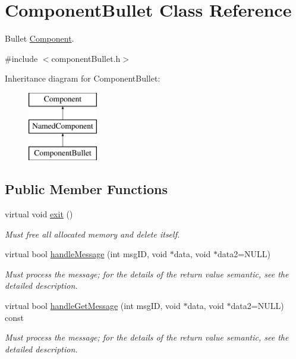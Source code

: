 \hypertarget{classComponentBullet}{
\section{\-Component\-Bullet \-Class \-Reference}
\label{d0/d26/classComponentBullet}
}


\-Bullet \hyperlink{classComponent}{\-Component}.  




{\ttfamily \#include $<$component\-Bullet.\-h$>$}

\-Inheritance diagram for \-Component\-Bullet\-:\begin{figure}[H]
\begin{center}
\leavevmode
\includegraphics[height=3.000000cm]{d0/d26/classComponentBullet}
\end{center}
\end{figure}
\subsection*{\-Public \-Member \-Functions}
\begin{DoxyCompactItemize}
\item 
\hypertarget{classComponentBullet_a299b9dcdffd6b9b5d46eada9c59f05f8}{
virtual void \hyperlink{classComponentBullet_a299b9dcdffd6b9b5d46eada9c59f05f8}{exit} ()}
\label{d0/d26/classComponentBullet_a299b9dcdffd6b9b5d46eada9c59f05f8}

\begin{DoxyCompactList}\small\item\em \-Must free all allocated memory and delete itself. \end{DoxyCompactList}\item 
virtual bool \hyperlink{classComponentBullet_a75f91f4d92ce327ab00776caf551b4da}{handle\-Message} (int msg\-I\-D, void $\ast$data, void $\ast$data2=\-N\-U\-L\-L)
\begin{DoxyCompactList}\small\item\em \-Must process the message; for the details of the return value semantic, see the detailed description. \end{DoxyCompactList}\item 
virtual bool \hyperlink{classComponentBullet_a1d46b3e25953f19ae208f86d6d47ab33}{handle\-Get\-Message} (int msg\-I\-D, void $\ast$data, void $\ast$data2=\-N\-U\-L\-L) const 
\begin{DoxyCompactList}\small\item\em \-Must process the message; for the details of the return value semantic, see the detailed description. \end{DoxyCompactList}\end{DoxyCompactItemize}
